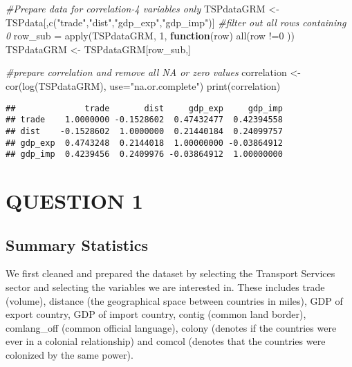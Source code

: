 \documentclass[
]{article}
\newenvironment{Shaded}{\begin{snugshade}}{\end{snugshade}}
\newcommand{\AttributeTok}[1]{\textcolor[rgb]{0.77,0.63,0.00}{#1}}
\newcommand{\CommentTok}[1]{\textcolor[rgb]{0.56,0.35,0.01}{\textit{#1}}}
\newcommand{\ControlFlowTok}[1]{\textcolor[rgb]{0.13,0.29,0.53}{\textbf{#1}}}
\newcommand{\DecValTok}[1]{\textcolor[rgb]{0.00,0.00,0.81}{#1}}
\newcommand{\FunctionTok}[1]{\textcolor[rgb]{0.00,0.00,0.00}{#1}}
\newcommand{\NormalTok}[1]{#1}
\newcommand{\OtherTok}[1]{\textcolor[rgb]{0.56,0.35,0.01}{#1}}
\newcommand{\SpecialCharTok}[1]{\textcolor[rgb]{0.00,0.00,0.00}{#1}}
\newcommand{\StringTok}[1]{\textcolor[rgb]{0.31,0.60,0.02}{#1}}
\begin{document}
\begin{Shaded}
\begin{Highlighting}[]
\CommentTok{\#Prepare data for correlation{-}4 variables only }
\NormalTok{TSPdataGRM }\OtherTok{\textless{}{-}}\NormalTok{ TSPdata[,}\FunctionTok{c}\NormalTok{(}\StringTok{"trade"}\NormalTok{,}\StringTok{"dist"}\NormalTok{,}\StringTok{"gdp\_exp"}\NormalTok{,}\StringTok{"gdp\_imp"}\NormalTok{)]}
\CommentTok{\#filter out all rows containing 0 }
\NormalTok{row\_sub }\OtherTok{=} \FunctionTok{apply}\NormalTok{(TSPdataGRM, }\DecValTok{1}\NormalTok{, }\ControlFlowTok{function}\NormalTok{(row) }\FunctionTok{all}\NormalTok{(row }\SpecialCharTok{!=}\DecValTok{0}\NormalTok{ ))}
\NormalTok{TSPdataGRM }\OtherTok{\textless{}{-}}\NormalTok{ TSPdataGRM[row\_sub,]}

\CommentTok{\#prepare correlation and remove all NA or zero values }
\NormalTok{correlation }\OtherTok{\textless{}{-}} \FunctionTok{cor}\NormalTok{(}\FunctionTok{log}\NormalTok{(TSPdataGRM), }\AttributeTok{use=}\StringTok{"na.or.complete"}\NormalTok{)}
\FunctionTok{print}\NormalTok{(correlation)}
\end{Highlighting}
\end{Shaded}

\begin{verbatim}
##              trade       dist     gdp_exp     gdp_imp
## trade    1.0000000 -0.1528602  0.47432477  0.42394558
## dist    -0.1528602  1.0000000  0.21440184  0.24099757
## gdp_exp  0.4743248  0.2144018  1.00000000 -0.03864912
## gdp_imp  0.4239456  0.2409976 -0.03864912  1.00000000
\end{verbatim}

\hypertarget{question-1}{%
\section{QUESTION 1}\label{question-1}}

\hypertarget{summary-statistics}{%
\subsection{Summary Statistics}\label{summary-statistics}}

We first cleaned and prepared the dataset by selecting the Transport
Services sector and selecting the variables we are interested in. These
includes trade (volume), distance (the geographical space between
countries in miles), GDP of export country, GDP of import country,
contig (common land border), comlang\_off (common official language),
colony (denotes if the countries were ever in a colonial relationship)
and comcol (denotes that the countries were colonized by the same
power).
\end{document}
